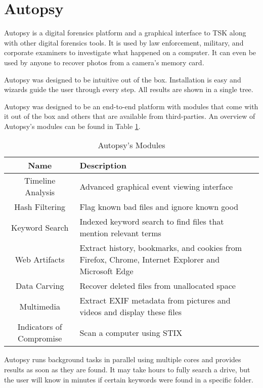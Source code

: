 \section{Autopsy}

Autopsy is a digital forensics platform and a graphical interface to TSK
along with other digital forensics tools. It is used by law enforcement, military, 
and corporate examiners to investigate what happened on a computer. It can even 
be used by anyone to recover photos from a camera's memory card.

Autopsy was designed to be intuitive out of the box. Installation is easy and
wizards guide the user through every step. All results are shown in a single tree.

Autopsy was designed to be an end-to-end platform with modules that come with
it out of the box and others that are available from third-parties. An overview of Autopsy's modules can be found in Table \ref{tab:autopsyModules}.

\begin{table}[ht]
  \begin{tabularx}{\textwidth}{@{}|c| *1{>{\centering\arraybackslash}X}@{}|}
    \hline
    \textbf{Name} & \textbf{Description} \\
    \hline\hline
    Timeline Analysis & Advanced graphical event viewing interface \\
    \hline
    Hash Filtering & Flag known bad files and ignore known good \\
    \hline
    Keyword Search & Indexed keyword search to find files that mention relevant terms \\
    \hline
    Web Artifacts & Extract history, bookmarks, and cookies from Firefox, Chrome, Internet Explorer and Microsoft Edge \\
    \hline
    Data Carving & Recover deleted files from unallocated space \\
    \hline
    Multimedia & Extract EXIF metadata from pictures and videos and display these files \\
    \hline
    Indicators of Compromise & Scan a computer using STIX \\
    \hline
  \end{tabularx}
    \caption{Autopsy's Modules}
  \label{tab:autopsyModules}
\end{table}

Autopsy runs background tasks in parallel using multiple cores and provides results as soon as they are found.
It may take hours to fully search a drive, but the user will know in minutes if certain keywords were found in a specific folder.

